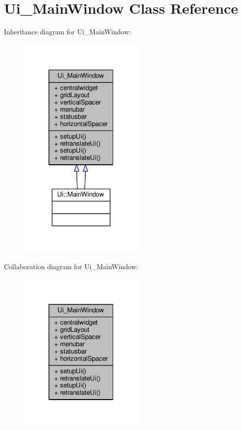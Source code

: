 \hypertarget{class_ui___main_window}{\section{Ui\-\_\-\-Main\-Window Class Reference}
\label{class_ui___main_window}
}


Inheritance diagram for Ui\-\_\-\-Main\-Window\-:\nopagebreak
\begin{figure}[H]
\begin{center}
\leavevmode
\includegraphics[width=176pt]{class_ui___main_window__inherit__graph}
\end{center}
\end{figure}


Collaboration diagram for Ui\-\_\-\-Main\-Window\-:\nopagebreak
\begin{figure}[H]
\begin{center}
\leavevmode
\includegraphics[width=176pt]{class_ui___main_window__coll__graph}
\end{center}
\end{figure}
